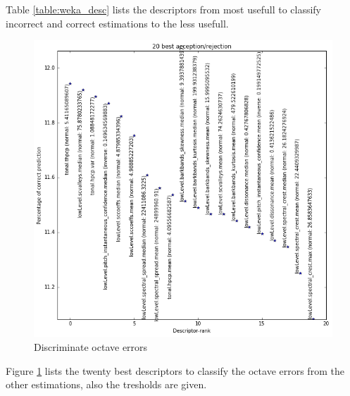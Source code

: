 \documentclass{article}
\begin{document}
Table \ref{table:weka_desc} lists the descriptors from most usefull to classify incorrect and correct estimations to the less usefull.
\begin{figure}
    \centering
    \includegraphics[scale=0.5]{img/pnOct_descr.png}
    \caption{Discriminate octave errors}
    \label{fig:pnOct_desc}
\end{figure}
Figure \ref{fig:pnOct_desc} lists the twenty best descriptors to classify the octave errors from the other estimations, also the tresholds are given.
\end{document}
